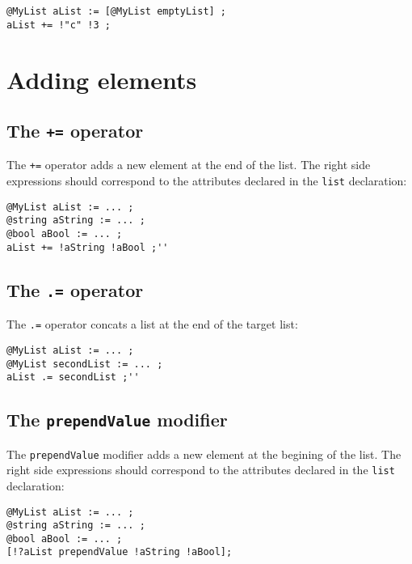 \begin{lstlisting}[language=galgas]
@MyList aList := [@MyList emptyList] ;
aList += !"c" !3 ;
\end{lstlisting}

\section{Adding elements}

\subsection{The \lstinline[language=galgas]!+=! operator}

The  \lstinline[language=galgas]!+=! operator adds a new element at the end of the list. The right side expressions should correspond to the attributes declared in the \lstinline[language=galgas]!list! declaration:\\

\begin{lstlisting}[language=galgas]
@MyList aList := ... ;
@string aString := ... ;
@bool aBool := ... ;
aList += !aString !aBool ;''
\end{lstlisting}


\subsection{The \lstinline[language=galgas]!.=! operator}

The \lstinline[language=galgas]!.=! operator concats a list at the end of the target list:

\begin{lstlisting}[language=galgas]
@MyList aList := ... ;
@MyList secondList := ... ;
aList .= secondList ;''
\end{lstlisting}



\subsection{The \lstinline[language=galgas]!prependValue! modifier}

The \lstinline[language=galgas]!prependValue! modifier adds a new element at the begining of the list. The right side expressions should correspond to the attributes declared in the  \lstinline[language=galgas]!list! declaration:

\begin{lstlisting}[language=galgas]
@MyList aList := ... ;
@string aString := ... ;
@bool aBool := ... ;
[!?aList prependValue !aString !aBool];
\end{lstlisting}

